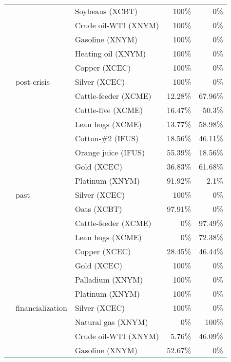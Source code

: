 \documentclass[]{elsarticle} %
\begin{document}
\begin{longtable}[t]{>{}lllrr}
\nopagebreak
 &  & Soybeans (XCBT) & 100\% & 0\%\\
\nopagebreak
 &  & Crude oil-WTI (XNYM) & 100\% & 0\%\\
\nopagebreak
 &  & Gasoline (XNYM) & 100\% & 0\%\\
\nopagebreak
 &  & Heating oil (XNYM) & 100\% & 0\%\\
\nopagebreak
 &  & Copper (XCEC) & 100\% & 0\%\\
\nopagebreak
\multirow[t]{-32}{*}{\raggedright\arraybackslash \textbf{market}} & \multirow[t]{-8}{*}{\raggedright\arraybackslash post-crisis} & Silver (XCEC) & 100\% & 0\%\\
\cmidrule{1-5}\pagebreak[0]
 &  & Cattle-feeder (XCME) & 12.28\% & 67.96\%\\
\nopagebreak
 &  & Cattle-live (XCME) & 16.47\% & 50.3\%\\
\nopagebreak
 &  & Lean hogs (XCME) & 13.77\% & 58.98\%\\
\nopagebreak
 &  & Cotton-\#2 (IFUS) & 18.56\% & 46.11\%\\
\nopagebreak
 &  & Orange juice (IFUS) & 55.39\% & 18.56\%\\
\nopagebreak
 &  & Gold (XCEC) & 36.83\% & 61.68\%\\
\nopagebreak
 &  & Platinum (XNYM) & 91.92\% & 2.1\%\\
\nopagebreak
 & \multirow[t]{-8}{*}{\raggedright\arraybackslash past} & Silver (XCEC) & 100\% & 0\%\\
\nopagebreak
 &  & Oats (XCBT) & 97.91\% & 0\%\\
\nopagebreak
 &  & Cattle-feeder (XCME) & 0\% & 97.49\%\\
\nopagebreak
 &  & Lean hogs (XCME) & 0\% & 72.38\%\\
\nopagebreak
 &  & Copper (XCEC) & 28.45\% & 46.44\%\\
\nopagebreak
 &  & Gold (XCEC) & 100\% & 0\%\\
\nopagebreak
 &  & Palladium (XNYM) & 100\% & 0\%\\
\nopagebreak
 &  & Platinum (XNYM) & 100\% & 0\%\\
\nopagebreak
 & \multirow[t]{-8}{*}{\raggedright\arraybackslash financialization} & Silver (XCEC) & 100\% & 0\%\\
\nopagebreak
 &  & Natural gas (XNYM) & 0\% & 100\%\\
\nopagebreak
 &  & Crude oil-WTI (XNYM) & 5.76\% & 46.09\%\\
\nopagebreak
 &  & Gasoline (XNYM) & 52.67\% & 0\%\\

\end{longtable}
\end{document}
